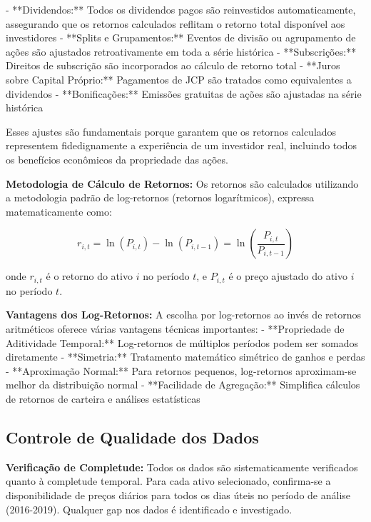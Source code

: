 - **Dividendos:** Todos os dividendos pagos são reinvestidos automaticamente, assegurando que os retornos calculados reflitam o retorno total disponível aos investidores
- **Splits e Grupamentos:** Eventos de divisão ou agrupamento de ações são ajustados retroativamente em toda a série histórica
- **Subscrições:** Direitos de subscrição são incorporados ao cálculo de retorno total
- **Juros sobre Capital Próprio:** Pagamentos de JCP são tratados como equivalentes a dividendos
- **Bonificações:** Emissões gratuitas de ações são ajustadas na série histórica

Esses ajustes são fundamentais porque garantem que os retornos calculados representem fidedignamente a experiência de um investidor real, incluindo todos os benefícios econômicos da propriedade das ações.

\textbf{Metodologia de Cálculo de Retornos:} Os retornos são calculados utilizando a metodologia padrão de log-retornos (retornos logarítmicos), expressa matematicamente como:

\begin{equation}
r_{i,t} = \ln(P_{i,t}) - \ln(P_{i,t-1}) = \ln\left(\frac{P_{i,t}}{P_{i,t-1}}\right)
\end{equation}

onde $r_{i,t}$ é o retorno do ativo $i$ no período $t$, e $P_{i,t}$ é o preço ajustado do ativo $i$ no período $t$.

\textbf{Vantagens dos Log-Retornos:} A escolha por log-retornos ao invés de retornos aritméticos oferece várias vantagens técnicas importantes:
- **Propriedade de Aditividade Temporal:** Log-retornos de múltiplos períodos podem ser somados diretamente
- **Simetria:** Tratamento matemático simétrico de ganhos e perdas
- **Aproximação Normal:** Para retornos pequenos, log-retornos aproximam-se melhor da distribuição normal
- **Facilidade de Agregação:** Simplifica cálculos de retornos de carteira e análises estatísticas

\subsection{Controle de Qualidade dos Dados}

\textbf{Verificação de Completude:} Todos os dados são sistematicamente verificados quanto à completude temporal. Para cada ativo selecionado, confirma-se a disponibilidade de preços diários para todos os dias úteis no período de análise (2016-2019). Qualquer gap nos dados é identificado e investigado.

